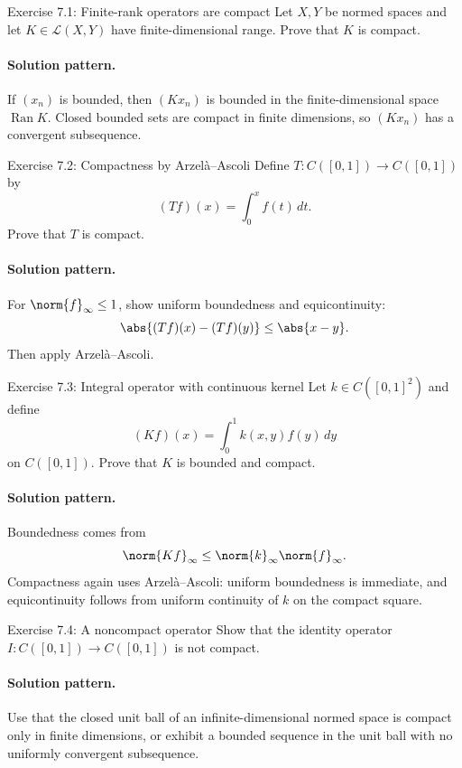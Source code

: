 \documentclass[header={Lecture 7 Exam Study Notes}]{study-note}
\begin{document}
\begin{exbox}{Exercise 7.1: Finite-rank operators are compact}
Let $X,Y$ be normed spaces and let $K\in\mathcal L(X,Y)$ have finite-dimensional range. Prove that $K$ is compact.

\paragraph{Solution pattern.}
If $(x_n)$ is bounded, then $(Kx_n)$ is bounded in the finite-dimensional space $\operatorname{Ran}K$. Closed bounded sets are compact in finite dimensions, so $(Kx_n)$ has a convergent subsequence.
\end{exbox}

\begin{exbox}{Exercise 7.2: Compactness by Arzel\`a--Ascoli}
Define $T:C([0,1])\to C([0,1])$ by
\[
(Tf)(x)=\int_0^x f(t)\,dt.
\]
Prove that $T$ is compact.

\paragraph{Solution pattern.}
For $\norm{f}_{\infty}\le 1$, show uniform boundedness and equicontinuity:
\[
\abs{(Tf)(x)-(Tf)(y)}\le \abs{x-y}.
\]
Then apply Arzel\`a--Ascoli.
\end{exbox}

\begin{exbox}{Exercise 7.3: Integral operator with continuous kernel}
Let $k\in C([0,1]^2)$ and define
\[
(Kf)(x)=\int_0^1 k(x,y)f(y)\,dy
\]
on $C([0,1])$. Prove that $K$ is bounded and compact.

\paragraph{Solution pattern.}
Boundedness comes from
\[
\norm{Kf}_{\infty}\le \norm{k}_{\infty}\norm{f}_{\infty}.
\]
Compactness again uses Arzel\`a--Ascoli: uniform boundedness is immediate, and equicontinuity follows from uniform continuity of $k$ on the compact square.
\end{exbox}

\begin{exbox}{Exercise 7.4: A noncompact operator}
Show that the identity operator $I:C([0,1])\to C([0,1])$ is not compact.

\paragraph{Solution pattern.}
Use that the closed unit ball of an infinite-dimensional normed space is compact only in finite dimensions, or exhibit a bounded sequence in the unit ball with no uniformly convergent subsequence.
\end{exbox}
\end{document}

